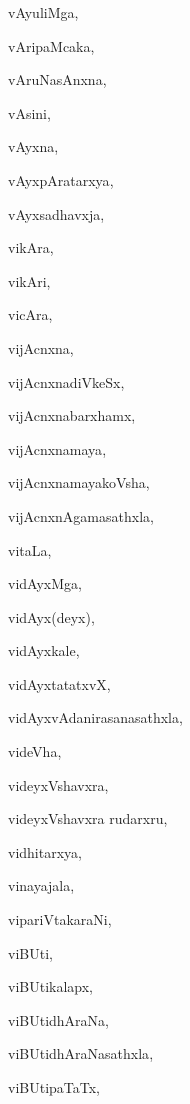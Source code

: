 \begin{multicols}{2}
{vAyuliMga}, \pageref{vAyuliMga}

{vAripaMcaka}, \pageref{vAripaMcaka}

{vAruNasAnxna}, \pageref{vAruNasAnxna}

{vAsini}, \pageref{vAsini}

{vAyxna}, \pageref{vAyxna}

{vAyxpAratarxya}, \pageref{vAyxpAratarxya}

{vAyxsadhavxja}, \pageref{vAyxsadhavxja}

{vikAra}, \pageref{vikAra}

{vikAri}, \pageref{vikAri}

{vicAra}, \pageref{vicAra}

{vijAcnxna}, \pageref{vijAcnxna}

{vijAcnxnadiVkeSx}, \pageref{vijAcnxnadiVkeSx}

{vijAcnxnabarxhamx}, \pageref{vijAcnxnabarxhamx}

{vijAcnxnamaya}, \pageref{vijAcnxnamaya}

{vijAcnxnamayakoVsha}, \pageref{vijAcnxnamayakoVsha}

{vijAcnxnAgamasathxla}, \pageref{vijAcnxnAgamasathxla}

{vitaLa}, \pageref{vitaLa}

{vidAyxMga}, \pageref{vidAyxMga}

{vidAyx(deyx)}, \pageref{vidAyxdeyx}

{vidAyxkale}, \pageref{vidAyxkale}

{vidAyxtatatxvX}, \pageref{vidAyxtatatxvX}

{vidAyxvAdanirasanasathxla}, \pageref{vidAyxvAdanirasanasathxla}

{videVha}, \pageref{videVha}

{videyxVshavxra}, \pageref{videyxVshavxra}

{videyxVshavxra rudarxru}, \pageref{videyxVshavxrarudarxru}

{vidhitarxya}, \pageref{vidhitarxya}

{vinayajala}, \pageref{vinayajala}

{vipariVtakaraNi}, \pageref{vipariVtakaraNi}

{viBUti}, \pageref{viBUti}

{viBUtikalapx}, \pageref{viBUtikalapx}

{viBUtidhAraNa}, \pageref{viBUtidhAraNa}

{viBUtidhAraNasathxla}, \pageref{viBUtidhAraNasathxla}

{viBUtipaTaTx}, \pageref{viBUtipaTaTx}


\end{multicols}
